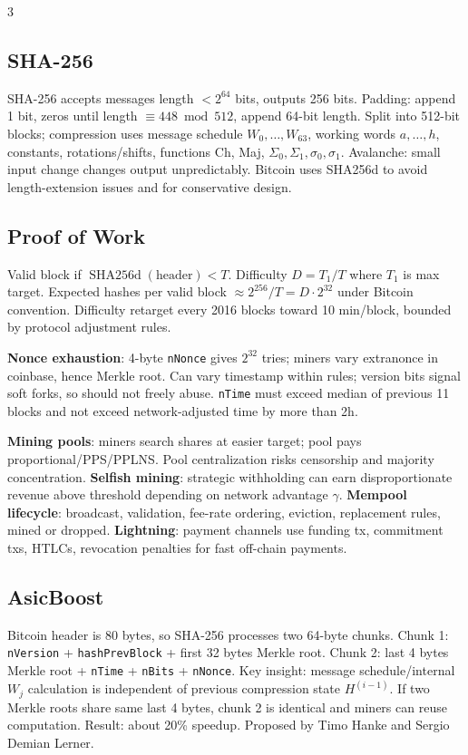 \documentclass[8pt]{extarticle}
\newcommand{\term}[1]{\textbf{#1}}
\begin{document}
\begin{multicols*}{3}
\subsection{SHA-256}
SHA-256 accepts messages length $<2^{64}$ bits, outputs 256 bits. Padding: append 1 bit, zeros until length $\equiv448\bmod512$, append 64-bit length. Split into 512-bit blocks; compression uses message schedule $W_0,\dots,W_{63}$, working words $a,\dots,h$, constants, rotations/shifts, functions Ch, Maj, $\Sigma_0,\Sigma_1,\sigma_0,\sigma_1$. Avalanche: small input change changes output unpredictably. Bitcoin uses SHA256d to avoid length-extension issues and for conservative design.

\subsection{Proof of Work}
Valid block if $\operatorname{SHA256d}(\mathrm{header}) < T$. Difficulty $D=T_1/T$ where $T_1$ is max target. Expected hashes per valid block $\approx 2^{256}/T = D\cdot 2^{32}$ under Bitcoin convention. Difficulty retarget every 2016 blocks toward 10 min/block, bounded by protocol adjustment rules.

\term{Nonce exhaustion}: 4-byte \texttt{nNonce} gives $2^{32}$ tries; miners vary extranonce in coinbase, hence Merkle root. Can vary timestamp within rules; version bits signal soft forks, so should not freely abuse. \texttt{nTime} must exceed median of previous 11 blocks and not exceed network-adjusted time by more than 2h.

\term{Mining pools}: miners search shares at easier target; pool pays proportional/PPS/PPLNS. Pool centralization risks censorship and majority concentration. \term{Selfish mining}: strategic withholding can earn disproportionate revenue above threshold depending on network advantage $\gamma$. \term{Mempool lifecycle}: broadcast, validation, fee-rate ordering, eviction, replacement rules, mined or dropped. \term{Lightning}: payment channels use funding tx, commitment txs, HTLCs, revocation penalties for fast off-chain payments.

\subsection{AsicBoost}
Bitcoin header is 80 bytes, so SHA-256 processes two 64-byte chunks. Chunk 1: \texttt{nVersion} + \texttt{hashPrevBlock} + first 32 bytes Merkle root. Chunk 2: last 4 bytes Merkle root + \texttt{nTime} + \texttt{nBits} + \texttt{nNonce}. Key insight: message schedule/internal $W_j$ calculation is independent of previous compression state $H^{(i-1)}$. If two Merkle roots share same last 4 bytes, chunk 2 is identical and miners can reuse computation. Result: about 20\% speedup. Proposed by Timo Hanke and Sergio Demian Lerner.


\end{multicols*}
\end{document}
